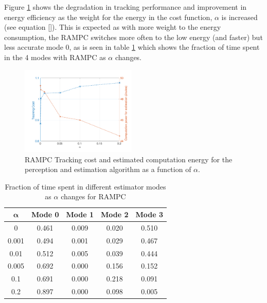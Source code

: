 Figure \ref{fig:CostAndEnergyVsAlpha} shows the degradation in tracking performance and improvement in energy efficiency as the weight for the energy in the cost function, $\alpha$ is increased (see equation \ref{}). This is expected as with more weight to the energy consumption, the RAMPC switches more often to the low energy (and faster) but less accurate mode 0, as is seen in table \ref{tbl:RAMPC_ModeTime} which shows the fraction of time spent in the 4 modes with RAMPC as $\alpha$ changes.


\begin{figure}[t]
	\centering
	\includegraphics[width=0.49\textwidth,scale=0.7]{figures/CostAndEnergyVsAlpha}
        \vspace{-20pt}
	\caption{RAMPC Tracking cost and estimated computation energy for the perception and estimation algorithm as a function of $\alpha$. }
	\label{fig:CostAndEnergyVsAlpha}
\end{figure}


\begin{table}[htb]
\label{tbl:RAMPC_ModeTime}
\begin{center}
\caption{Fraction of time spent in different estimator modes as $\alpha$ changes for RAMPC}
\begin{tabular} {|c|c|c|c|c|}
	\hline
	$\pmb{\alpha}$ & \textbf{Mode 0} & \textbf{Mode 1} & \textbf{Mode 2} & \textbf{Mode 3} \\ \hline
	0 & 0.461 & 0.009 & 0.020 & 0.510 \\ \hline
 	0.001 &  0.494 & 0.001 & 0.029 & 0.467 \\ \hline
	0.01 & 0.512 & 0.005 & 0.039 & 0.444  \\ \hline
	0.005 &  0.692 & 0.000 & 0.156 & 0.152 \\ \hline
	0.1 & 0.691 & 0.000 & 0.218 & 0.091 \\ \hline
	0.2 & 0.897 & 0.000 & 0.098 & 0.005  \\ \hline
	\end{tabular}	
	\end{center}
\end{table}

